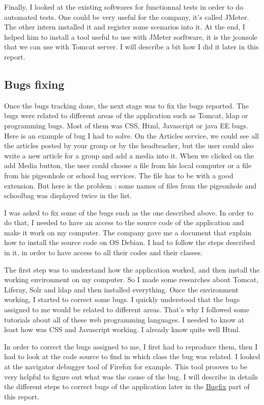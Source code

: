 Finally, I looked at the existing softwares for functionnal tests in order to do automated 
tests. One could be very useful for the company, it's called JMeter. The other intern 
installed it and register some scenarios into it. At the end, I helped him to install
a tool useful to use with JMeter sorftware, it is the jconsole that we can use with Tomcat
server. I will describe a bit how I did it later in this report. 



\newpage
\subsection{Bugs fixing}
Once the bugs tracking done, the next stage was to fix the bugs reported. 
The bugs were related to different areas of the application
such as Tomcat, ldap or programming bugs. Most of them was CSS, Html, Javascript or java EE
bugs. Here is an example of bug I had to solve. On the Articles service, we could see
all the articles posted by your group or by the headteacher, but the user could also
write a new article for a group and add a media into it. 
When we clicked on the add Media button, 
the user could choose a file from his local computer or a file from his pigeonhole or school
bag services. 
The file has to be with a good extension. But here is the problem : some names of files
from the pigeonhole and schoolbag was displayed twice in the list.  

I was asked to fix some of the bugs such as the one described above. 
In order to do that, I needed to have an access to the source code of the application
 and make it work on my computer.
The company gave me a document that explain how to install the source code on OS Debian. 
I had to follow the steps described in it, in order to have access to all their codes 
and their classes.

The first step was to understand how the application worked, and then install the working 
environment on my computer. 
So I made some researches about Tomcat, Liferay, Solr and ldap and then installed everything. 
Once the environment working, I started to correct some bugs. I quickly understood that
the bugs assigned to me would be related to different areas.  
That's why I followed some tutorials about all of these web programming languages. I 
needed to know at least how was CSS and Javascript working. I already know quite well
Html.  

In order to correct the bugs assigned to me, I first had to reproduce them, then I had
to look at the code source to find in which class the bug was related. I looked at 
the navigator debugger tool of Firefox for example. This tool prooves to be very helpful 
to figure out what was the cause of the bug. I will describe in details
the different steps to correct bugs of the application later in the   
\hyperlink{ancre}{Bugfix} part of this report.
